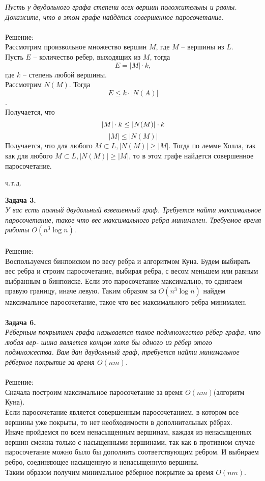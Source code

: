 \documentclass[12pt,a4paper]{scrartcl}
\begin{document}
	\textit{Пусть у двудольного графа степени всех вершин положительны и равны. Докажите, что
		в этом графе найдётся совершенное паросочетание.}\\
	\\
	Решение:\\
	Рассмотрим произвольное множество вершин $M$, где $M$ -- вершины из $L$.\\
	 Пусть $E$ -- количество ребер, выходящих из $M$, тогда   $$E = |M| \cdot k,$$ где $k$ -- степень любой вершины. \\
	 Рассмотрим $N(M)$. Тогда $$E \leq k \cdot |N(A)|$$. \\
	 Получается, что $$|M| \cdot k \leq |N(M)| \cdot k \\
	 $$
	 $$|M| \leq |N(M)|$$
	 Получается, что для
	 любого $M \subset L, |N(M)| \geq |M|.$ Тогда по лемме Холла, так как для любого $M \subset L, |N(M)| \geq |M|$, то в этом графе найдется совершенное паросочетание.\\
	 \begin{flushright}
	 	ч.т.д.
	 	\end{flushright}
	\textbf{Задача 3.} \\
	\textit{У вас есть полный двудольный взвешенный граф. Требуется найти максимальное паросочетание, такое что вес максимального ребра минимален. Требуемое время работы $O(n^3 \log n)$}.\\
	\\
	Решение:\\
	Воспользуемся бинпоиском по весу ребра и алгоритмом Куна. Будем выбирать вес ребра и строим паросочетание, выбирая ребра, с весом меньшем или равным выбранным в бинпоиске. Если это паросочетание максимально, то сдвигаем правую границу, иначе левую. Таким образом за $O(n^3 \log n)$ найдем максимальное паросочетание, такое что вес максимального ребра минимален.\\
	\\
	\textbf{Задача 6.} \\
	\textit{Рёберным покрытием графа называется такое подмножество рёбер графа, что любая вер-
		шина является концом хотя бы одного из рёбер этого подмножества. Вам дан двудольный
		граф, требуется найти минимальное рёберное покрытие за время $O(nm)$.}\\
	\\
	Решение:\\
	Сначала построим максимальное паросочетание за время $O(nm)$(алгоритм Куна). \\
	Если паросочетание является совершенным паросочетанием, в котором все вершины уже покрыты, то нет необходимости в дополнительных рёбрах.\\ 
	Иначе пройдемся по всем ненасыщенным вершинам, каждая из ненасыщенных вершин смежна только с насыщенными вершинами, так как в противном случае паросочетание  можно было бы дополнить соответствующим ребром. И выбираем ребро, соединяющее насыщенную и ненасыщенную вершины. \\
	Таким образом получим минимальное рёберное покрытие за время $O(nm)$.
	
\end{document}
